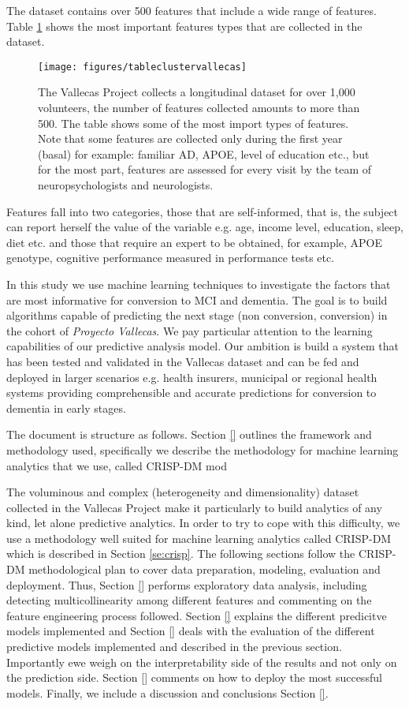 \documentclass[11pt]{article}
\begin{document}
The dataset contains over 500 features that include a wide range of features. Table \ref{fig:tableclustervallecas} shows the most important features types that are collected in the dataset.
\begin{figure}[h]
        \centering
        \texttt{[image: figures/tableclustervallecas]}
        \caption{The Vallecas Project collects a longitudinal dataset for over 1,000 volunteers, the number of features collected amounts to more than 500. The table shows some of the most import types of features. Note that some features are collected only during the first year (basal) for example: familiar AD, APOE, level of education etc., but for the most part, features are assessed for every visit by the team of neuropsychologists and neurologists.}
\label{fig:tableclustervallecas}
\end{figure}

Features fall into two categories, those that are self-informed, that is, the subject can report herself the value of the variable e.g. age, income level, education, sleep, diet etc. and those that require an expert to be obtained, for example, APOE genotype, cognitive performance measured in performance tests etc.
  
In this study we use machine learning techniques to investigate the factors that are most informative for conversion to MCI and dementia. The goal is to build algorithms capable of predicting the next stage (non conversion, conversion) in the cohort of \emph{Proyecto Vallecas}. We pay particular attention to the learning capabilities of our predictive analysis model. Our ambition is build a system that has been tested and validated in the Vallecas dataset and can be fed and deployed in larger scenarios e.g. health insurers, municipal or regional health systems providing comprehensible and accurate predictions for conversion to dementia in early stages.

The document is structure as follows. Section \ref{} outlines the framework and methodology used, specifically we describe the methodology for machine learning analytics that we use, called CRISP-DM mod

 The voluminous and complex (heterogeneity and dimensionality) dataset collected in the Vallecas Project make it particularly to build analytics of any kind, let alone predictive analytics. In order to try to cope with this difficulty, we use a methodology well suited for machine learning analytics called CRISP-DM which is described in Section \ref{se:crisp}. The following sections follow the CRISP-DM methodological plan to cover data preparation, modeling, evaluation and deployment. Thus, Section \ref{} performs exploratory data analysis, including detecting multicollinearity among different features and commenting on the feature engineering process followed. Section \ref{} explains the different predicitve models implemented and Section \ref{} deals with the evaluation of the different predictive models implemented and described in the previous section. Importantly ewe weigh on the interpretability side of the results and not only on the prediction side.
 Section \ref{} comments on how to deploy the most successful models. Finally, we include a discussion and conclusions Section \ref{}.
\end{document}
